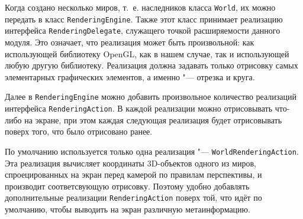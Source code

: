 Когда создано несколько миров, т.~е. наследников класса \texttt{World}, их можно передать в класс
\texttt{RenderingEngine}. Также этот класс принимает реализацию интерфейса \texttt{RenderingDelegate}, служащего точкой
расширяемости данного модуля. Это означает, что реализация может быть произвольной: как использующей библиотеку
OpenGL, как в нашем случае, так и использующей любую другую библиотеку. Реализация должна задавать только отрисовку
самых элементарных графических элементов, а именно "--- отрезка и круга.

Далее в \texttt{RenderingEngine} можно добавить произвольное количество реализаций интерфейса \texttt{RenderingAction}.
В каждой реализации можно отрисовывать что-либо на экране, при этом каждая следующая реализация будет отрисовывать
поверх того, что было отрисовано ранее.

По умолчанию используется только одна реализация "--- \texttt{WorldRende\-ring\-Ac\-tion}. Эта реализация вычисляет
координаты 3D-объектов одного из миров, спроецированных на экран перед камерой по правилам перспективы,
и производит соответсвующую отрисовку. Поэтому удобно добавлять дополнительные реализации \texttt{RenderingAc\-tion}
поверх той, что идёт по умолчанию, чтобы выводить на экран различную метаинформацию.
